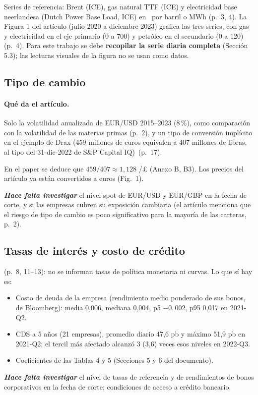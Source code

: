 \documentclass{article} %
\newcommand{\pg}[1]{(p.~#1)}
\newcommand{\eur}{\texteuro}
\begin{document}
        Series de referencia: Brent (ICE), gas natural TTF (ICE) y electricidad base neerlandesa (Dutch Power Base Load, ICE) en \eur\ por barril o MWh \pg{3, 4}. La Figura 1 del artículo (julio 2020 a diciembre 2023) grafica las tres series, con gas y electricidad en el eje primario (0 a 700) y petróleo en el secundario (0 a 120) \pg{4}. Para este trabajo se debe \textbf{recopilar la serie diaria completa} (Sección 5.3); las lecturas visuales de la figura no se usan como datos.

    \subsection{Tipo de cambio}

        \paragraph{Qué da el artículo.} 
        Solo la volatilidad anualizada de EUR/USD 2015--2023 (8\,\%), como comparación con la volatilidad de las materias primas \pg{2}, y un tipo de conversión implícito en el ejemplo de Drax (459 millones de euros equivalen a 407 millones de libras, al tipo del 31-dic-2022 de S\&P Capital IQ)\ \pg{17}. 
        
        En el paper se deduce que $459/407\approx 1{,}128$ \eur/£ (Anexo B, B3). Los precios del artículo ya están convertidos a euros (Fig.~1). 
        
        \textit{\textbf{Hace falta investigar}} el nivel spot de EUR/USD y EUR/GBP en la fecha de corte, y si las empresas cubren su exposición cambiaria (el artículo menciona que el riesgo de tipo de cambio es poco significativo para la mayoría de las carteras, p.~2).

    \subsection{Tasas de interés y costo de crédito}

        \pg{8, 11--13}: no se informan tasas de política monetaria ni curvas. Lo que sí hay es:
        \begin{itemize}
            \item Costo de deuda de la empresa (rendimiento medio ponderado de sus bonos, de Bloomberg): media 0,006, mediana 0,004, p5 $-0{,}002$, p95 0,017 en 2021-Q2.
            \item CDS a 5 años (21 empresas), promedio diario 47,6 pb y máximo 51,9 pb en 2021-Q2; el tercil más afectado alcanzó 3 (3,6) veces esos niveles en 2022-Q3.
            \item Coeficientes de las Tablas 4 y 5 (Secciones 5 y 6 del documento).
        \end{itemize}
        \textit{\textbf{Hace falta investigar}} el nivel de tasas de referencia y de rendimientos de bonos corporativos en la fecha de corte; condiciones de acceso a crédito bancario.
\end{document}
